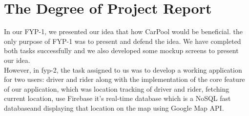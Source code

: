\section{The Degree of Project Report}
In our FYP-1, we presented our idea that how CarPool would be beneficial. the only purpose of FYP-1 was to present and defend the idea. We have completed both tasks successfully and we also developed some mockup screens to present our idea.
\\ However, in fyp-2, the task assigned to us was to develop a working application for two users: driver and rider along with the implementation of the core feature of our application, which was location tracking of driver and rider, fetching current location, use Firebase it’s real-time database which is a NoSQL fast databaseand displaying that location on the map using Google Map API.
